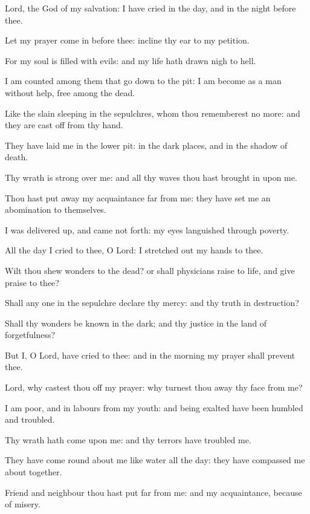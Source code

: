 ﻿\item Lord, the God of my salvation: I have cried in the day, and in the night before thee.
\item Let my prayer come in before thee: incline thy ear to my petition.
\item For my soul is filled with evils: and my life hath drawn nigh to hell.
\item I am counted among them that go down to the pit: I am become as a man without help, free among the dead.
\item Like the slain sleeping in the sepulchres, whom thou rememberest no more: and they are cast off from thy hand.
\item They have laid me in the lower pit: in the dark places, and in the shadow of death.
\item Thy wrath is strong over me: and all thy waves thou hast brought in upon me.
\item Thou hast put away my acquaintance far from me: they have set me an abomination to themselves.
\item I was delivered up, and came not forth: my eyes languished through poverty.
\item All the day I cried to thee, O Lord: I stretched out my hands to thee.
\item Wilt thou shew wonders to the dead? or shall physicians raise to life, and give praise to thee?
\item Shall any one in the sepulchre declare thy mercy: and thy truth in destruction?\ifx\enlinebreakaftertwelve\undefined\else\\\fi
\item Shall thy wonders be known in the dark; and thy justice in the land of forgetfulness?
\item But I, O Lord, have cried to thee: and in the morning my prayer shall prevent thee.
\item Lord, why castest thou off my prayer: why turnest thou away thy face from me?
\item I am poor, and in labours from my youth: and being exalted have been humbled and troubled.
\item Thy wrath hath come upon me: and thy terrors have troubled me.
\item They have come round about me like water all the day: they have compassed me about together.
\item Friend and neighbour thou hast put far from me: and my acquaintance, because of misery.
